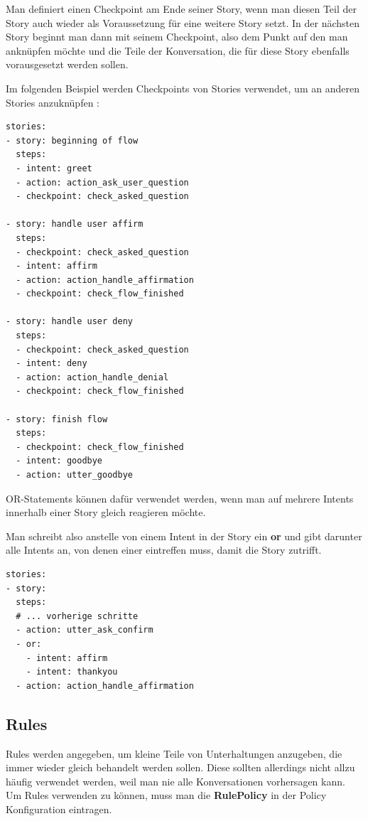 Man definiert einen Checkpoint am Ende seiner Story, wenn man diesen Teil der Story auch wieder als Voraussetzung für eine weitere Story setzt.
In der nächsten Story beginnt man dann mit seinem Checkpoint, also dem Punkt auf den man anknüpfen möchte und die Teile der Konversation, die für diese Story ebenfalls vorausgesetzt werden sollen.

Im folgenden Beispiel werden Checkpoints von Stories verwendet, um an anderen Stories anzuknüpfen\cite{checkpoints}
:

\begin{lstlisting}[label={lst: Checkpoints Example}]
stories:
- story: beginning of flow
  steps:
  - intent: greet
  - action: action_ask_user_question
  - checkpoint: check_asked_question

- story: handle user affirm
  steps:
  - checkpoint: check_asked_question
  - intent: affirm
  - action: action_handle_affirmation
  - checkpoint: check_flow_finished

- story: handle user deny
  steps:
  - checkpoint: check_asked_question
  - intent: deny
  - action: action_handle_denial
  - checkpoint: check_flow_finished

- story: finish flow
  steps:
  - checkpoint: check_flow_finished
  - intent: goodbye
  - action: utter_goodbye
\end{lstlisting}

OR-Statements können dafür verwendet werden, wenn man auf mehrere Intents innerhalb einer Story gleich reagieren möchte.\cite{orStatements}

Man schreibt also anstelle von einem Intent in der Story ein \textbf{or} und gibt darunter alle Intents an, von denen einer eintreffen muss, damit die Story zutrifft.

\begin{lstlisting}[label={lst: OR Example}]
stories:
- story:
  steps:
  # ... vorherige schritte
  - action: utter_ask_confirm
  - or:
    - intent: affirm
    - intent: thankyou
  - action: action_handle_affirmation
\end{lstlisting}

\subsection{Rules}

Rules werden angegeben, um kleine Teile von Unterhaltungen anzugeben, die immer wieder gleich behandelt werden sollen.
Diese sollten allerdings nicht allzu häufig verwendet werden, weil man nie alle Konversationen vorhersagen kann.
Um Rules verwenden zu können, muss man die \textbf{RulePolicy} in der Policy Konfiguration eintragen.\cite{rules}

